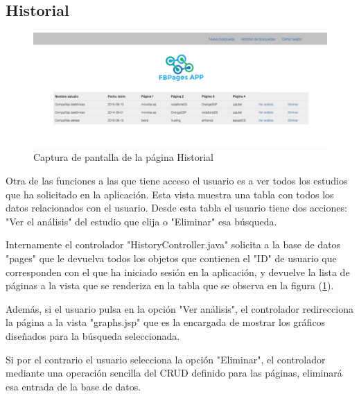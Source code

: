\subsection{Historial}
\begin{figure}[H]
\centering
\includegraphics[width=5in]{figuras/historial.png}
\caption{Captura de pantalla de la página Historial} \label{fig:historial}
\end{figure}
Otra de las funciones a las que tiene acceso el usuario es a ver todos los estudios que ha solicitado en la aplicación. Esta vista muestra una tabla con todos los datos relacionados con el usuario. Desde esta tabla el usuario tiene dos acciones: "Ver el análisis" del estudio que elija o "Eliminar" esa búsqueda. 

Internamente el controlador "HistoryController.java" solicita a la base de datos "pages" que le devuelva todos los objetos que contienen el "ID" de usuario que corresponden con el que ha iniciado sesión en la aplicación, y devuelve la lista de páginas a la vista que se renderiza en la tabla que se observa en la figura (\ref{fig:historial}).

Además, si el usuario pulsa en la opción "Ver análisis", el controlador redirecciona la página a la vista "graphs.jsp" que es la encargada de mostrar los gráficos diseñados para la búsqueda seleccionada. 

Si por el contrario el usuario selecciona la opción "Eliminar", el controlador mediante una operación sencilla del CRUD definido para las páginas, eliminará esa entrada de la base de datos.
 
